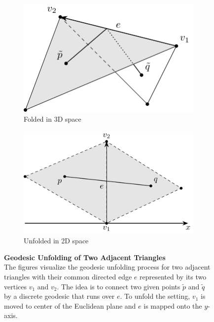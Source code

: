 \documentclass{stdlocal}
\begin{document}
  \begin{figure}
    \begin{subfigure}[b]{0.49\linewidth}
      \centering
      \includegraphics[width=0.9\linewidth]{figures/unfolding_geodesic.pdf}
      \caption{Folded in 3D space}
      \label{fig:geodesic-unfolding-folded}
    \end{subfigure}
    \hfill
    \begin{subfigure}[b]{0.49\linewidth}
      \centering
      \includegraphics[width=\linewidth]{figures/unfolding_unfolded.pdf}
      \caption{Unfolded in 2D space}
      \label{fig:geodesic-unfolding-unfolded}
    \end{subfigure}
    \caption[Geodesic Unfolding of Two Adjacent Triangles]{%
      \textbf{Geodesic Unfolding of Two Adjacent Triangles}\\
      The figures visualize the geodesic unfolding process for two adjacent triangles with their common directed edge $e$ represented by its two vertices $v_1$ and $v_2$.
      The idea is to connect two given points $\tilde{p}$ and $\tilde{q}$ by a discrete geodesic that runs over $e$.
      To unfold the setting, $v_1$ is moved to center of the Euclidean plane and $e$ is mapped onto the $y$-axis.
    }
    \label{fig:geodesic-unfolding}
  \end{figure}
\end{document}
